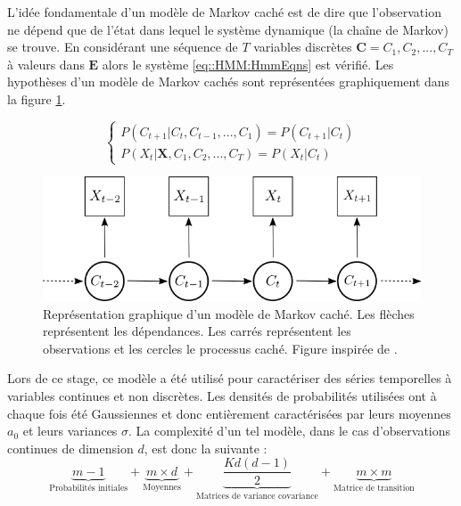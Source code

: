 \documentclass[12pt]{report}
\begin{document}
L'idée fondamentale d'un modèle de Markov caché est de dire que l'observation ne dépend que de l'état dans lequel le système dynamique (la chaîne de Markov) se trouve. En considérant une séquence de $T$ variables discrètes $\bm{C}=C_1,C_2,...,C_T$ à valeurs dans $\bm{E}$ alors le système \eqref{eq::HMM:HmmEqns} est vérifié. Les hypothèses d'un modèle de Markov cachés sont représentées graphiquement dans la figure \ref{fig::HMM:HMM_Graph}. 

\begin{equation}
\begin{cases}
P\left( C_{t+1} | C_t,C_{t-1},...,C_1  \right) = P\left( C_{t+1} | C_t  \right)\\
P\left( X_t | \bm{X} , C_1,C_2,...,C_T \right) = P(X_t | C_t)
\end{cases}
\label{eq::HMM:HmmEqns}
\end{equation}

\begin{figure}[ht]
	\begin{center}
		\includegraphics[width= 0.6 \textwidth]{Images/Models/HMM/HMM.png}
		\caption{Représentation graphique d'un modèle de Markov caché. Les flèches représentent les dépendances. Les carrés représentent les observations et les cercles le processus caché. Figure inspirée de \cite{zucchini_hidden_2017}.}
		\label{fig::HMM:HMM_Graph}
	\end{center}
\end{figure}


Lors de ce stage, ce modèle a été utilisé pour caractériser des séries temporelles à variables continues et non discrètes. Les densités de probabilités utilisées ont à chaque fois été Gaussiennes et donc entièrement caractérisées par leurs moyennes $a_0$ et leurs variances $\sigma$. La complexité d'un tel modèle, dans le cas d'observations continues de dimension $d$, est donc la suivante :
\begin{equation}
\underbrace{m-1}_\text{Probabilités initiales}  + \underbrace{m \times d}_\text{Moyennes}  +  \underbrace{\frac{Kd \left(d - 1\right)}{2}}_\text{Matrices de variance covariance} + \underbrace{m \times m}_\text{Matrice de transition}
\label{eq:Model_HMM_ParamNumber} 
\end{equation}
\end{document}
